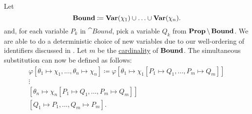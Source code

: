 \begin{definition}
\begin{thmenum}
    Let
    \begin{equation*}
      \operatorname{\mathbf{Bound}} \coloneqq \operatorname{\mathbf{Var}}(\chi_1) \cup \ldots \cup \operatorname{\mathbf{Var}}(\chi_n).
    \end{equation*}
    and, for each variable \( P_k \) in \( \cat{Bound} \), pick a variable \( Q_k \) from \( \operatorname{\mathbf{Prop}} \setminus \operatorname{\mathbf{Bound}} \). We are able to do a deterministic choice of new variables due to our well-ordering of identifiers discussed in . Let \( m \) be the \hyperref[def:cardinal]{cardinality} of \( \operatorname{\mathbf{Bound}} \). The simultaneous substitution can now be defined as follows:
    \begin{align*}
      \varphi[\theta_1 \mapsto \chi_1, \ldots, \theta_n \mapsto \chi_n] \coloneqq \varphi
      [\theta_1 \mapsto \chi_1[P_1 \mapsto Q_1, \ldots, P_m \mapsto Q_m]] \\
      \vdots \hspace{3cm} \\
      [\theta_n \mapsto \chi_n[P_1 \mapsto Q_1, \ldots, P_m \mapsto Q_m]] \\
      [Q_1 \mapsto P_1, \ldots, Q_m \mapsto P_m].
    \end{align*}
  \end{thmenum}
\end{definition}

